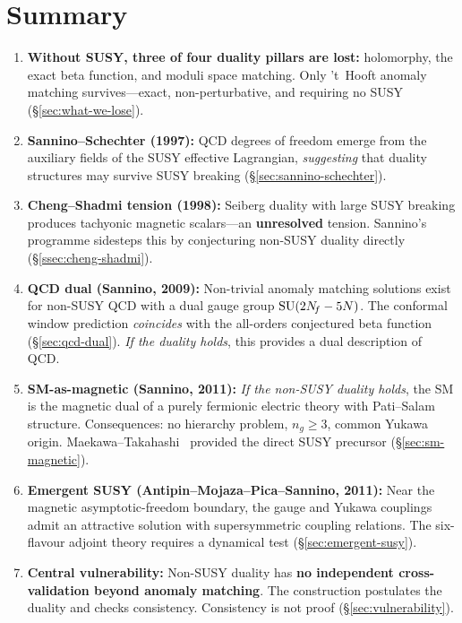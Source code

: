 \documentclass[11pt,a4paper]{article}
\begin{document}
\section{Summary}
\label{sec:summary}

\begin{tcolorbox}[
  enhanced,
  colback=green!5!white,
  colframe=green!60!black,
  fonttitle=\bfseries,
  title={Lecture 6: Summary}
]
\begin{enumerate}
  \item \textbf{Without SUSY, three of four duality pillars are lost:}
    holomorphy, the exact beta function, and moduli space matching.
    Only 't~Hooft anomaly matching survives---exact, non-perturbative,
    and requiring no SUSY (\S\ref{sec:what-we-lose}).

  \item \textbf{Sannino--Schechter (1997):}  QCD degrees of freedom
    emerge from the auxiliary fields of the SUSY effective Lagrangian,
    \emph{suggesting} that duality structures may survive SUSY breaking
    (\S\ref{sec:sannino-schechter}).

  \item \textbf{Cheng--Shadmi tension (1998):}  Seiberg duality with
    large SUSY breaking produces tachyonic magnetic scalars---an
    \textbf{unresolved} tension.  Sannino's programme sidesteps this
    by conjecturing non-SUSY duality directly
    (\S\ref{ssec:cheng-shadmi}).

  \item \textbf{QCD dual (Sannino, 2009):}  Non-trivial anomaly
    matching solutions exist for non-SUSY QCD with a dual gauge
    group $\mathrm{SU}(2N_{\!f} - 5N)$.  The conformal window prediction
    \emph{coincides} with the all-orders conjectured beta function
    (\S\ref{sec:qcd-dual}).  \emph{If the duality holds}, this
    provides a dual description of QCD.

  \item \textbf{SM-as-magnetic (Sannino, 2011):}  \emph{If the
    non-SUSY duality holds}, the SM is the magnetic dual of a
    purely fermionic electric theory with Pati--Salam structure.
    Consequences: no hierarchy problem, $n_g \geq 3$, common Yukawa
    origin.  Maekawa--Takahashi~\cite{MT1996} provided the
    direct SUSY precursor (\S\ref{sec:sm-magnetic}).

  \item \textbf{Emergent SUSY (Antipin--Mojaza--Pica--Sannino, 2011):}
    Near the magnetic asymptotic-freedom boundary, the gauge and
    Yukawa couplings admit an attractive solution with supersymmetric
    coupling relations. The six-flavour adjoint theory requires a
    dynamical test (\S\ref{sec:emergent-susy}).

  \item \textbf{Central vulnerability:}  Non-SUSY duality has
    \textbf{no independent cross-validation beyond anomaly matching}.
    The construction postulates the duality and checks consistency.
    Consistency is not proof (\S\ref{sec:vulnerability}).
\end{enumerate}
\end{tcolorbox}
\end{document}
